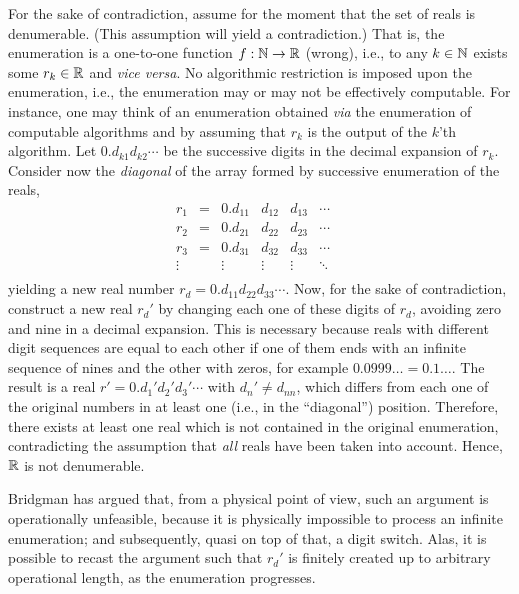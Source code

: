 {\color{OliveGreen}
\bproof
 For the sake of contradiction, assume for the moment that the set of reals is denumerable.
 (This assumption will yield a contradiction.)
 That is, the enumeration is a one-to-one function $f: {\Bbb N} \rightarrow
 {\Bbb R}$ (wrong), i.e., to any $k\in {\Bbb N}$ exists some  $r_k\in {\Bbb R} $
 and {\it vice versa}. No algorithmic
 restriction is imposed upon the enumeration, i.e., the enumeration
 may or may not be effectively computable.
 For instance, one may think of an enumeration
 obtained {\it via} the
 enumeration of computable algorithms and by assuming that $r_k$ is the
 output of the $k$'th algorithm.
 Let $0.d_{k1}d_{k2}\cdots $ be the successive digits in the decimal
 expansion of $r_k$.
 Consider now the {\em diagonal} of the array formed by successive
 enumeration of the reals,
 \begin{equation}
 \begin{array}{ccccccccc}
 r_1&=&0.d_{11}&d_{12}&d_{13}&\cdots \\
 r_2&=&0.d_{21}& d_{22}&d_{23}&\cdots \\
 r_3&=&0.d_{31}&d_{32}& d_{33}&\cdots \\
 \vdots &&\vdots  &\vdots &\vdots & \ddots \\ \end{array} \quad
 \end{equation}
 yielding a new real number $r_d=0.d_{11}d_{22}d_{33}\cdots $.
 Now, for the sake of contradiction, construct a new real $r_d'$ by changing each one of these digits of $r_d$,
avoiding zero and nine in a decimal
 expansion. This is necessary because reals with different
 digit sequences are equal to each other if one of them ends with an
 infinite sequence of nines and the other with zeros, for example
 $0.0999\ldots =0.1\ldots $.
 The result is a real
  $r'=0.d_{1}'d_{2}'d_{3}'\cdots $
  with $d_n'\neq  d_{nn}$,
 which differs from each one of the original numbers in at least
 one (i.e., in the ``diagonal'') position.
 Therefore, there exists at least one real which is not contained in the
 original enumeration, contradicting the assumption that {\em all}
 reals have been taken into account.
 Hence, ${\Bbb R}$ is not denumerable.
\eproof
}

Bridgman has argued \cite{bridgman} that, from a physical point of view, such an argument is operationally unfeasible,
because it is physically impossible to process an infinite enumeration; and subsequently, quasi on top of that, a digit switch.
Alas, it is possible to recast the argument such that $r_d'$ is finitely created up to arbitrary operational length,
as the enumeration progresses.


